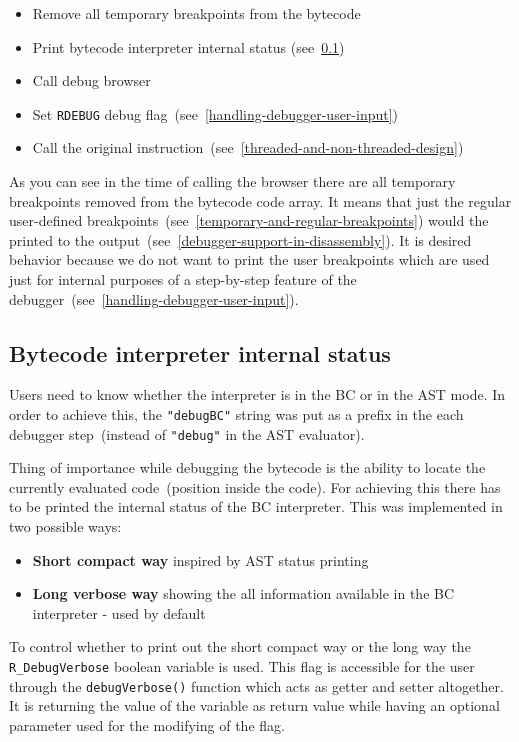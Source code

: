 \documentclass[thesis=M,english]{FITthesis}[2018/10/20]
\newcommand{\code}[1]{\texttt{#1}}
\begin{document}
\begin{itemize}
	\item Remove all temporary breakpoints from the bytecode
	\item Print bytecode interpreter internal status (see~\ref{bytecode-interpreter-internal-status})
	\item Call debug browser
	\item Set \code{RDEBUG} debug flag~(see~\ref{handling-debugger-user-input})
	\item Call the original instruction~(see~\ref{threaded-and-non-threaded-design})
\end{itemize}

As you can see in the time of calling the browser there are all temporary breakpoints removed from the bytecode code array. It means that just the regular user-defined breakpoints~(see~\ref{temporary-and-regular-breakpoints}) would the printed to the output~(see~\ref{debugger-support-in-disassembly}). It is desired behavior because we do not want to print the user breakpoints which are used just for internal purposes of a step-by-step feature of the debugger~(see~\ref{handling-debugger-user-input}).

\subsection{Bytecode interpreter internal status}\label{bytecode-interpreter-internal-status}

Users need to know whether the interpreter is in the BC or in the AST mode. In order to achieve this, the \code{"debugBC"} string was put as a prefix in the each debugger step~(instead of \code{"debug"} in the AST evaluator).

Thing of importance while debugging the bytecode is the ability to locate the currently evaluated code~(position inside the code). For achieving this there has to be printed the internal status of the BC interpreter. This was implemented in two possible ways:

\begin{itemize}
	\item \textbf{Short compact way} inspired by AST status printing
	\item \textbf{Long verbose way} showing the all information available in the BC interpreter - used by default
\end{itemize}

To control whether to print out the short compact way or the long way the \code{R{\_}DebugVerbose} boolean variable is used. This flag is accessible for the user through the \code{debugVerbose()} function which acts as getter and setter altogether. It is returning the value of the variable as return value while having an optional parameter used for the modifying of the flag.
\end{document}
